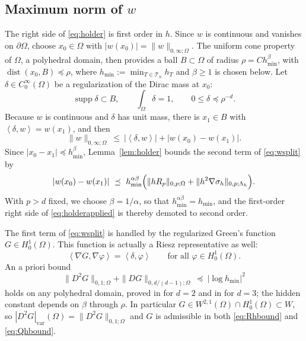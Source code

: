 \documentclass[12pt]{amsart}
\numberwithin{equation}{section}
\theoremstyle{plain}
\theoremstyle{definition}
\theoremstyle{remark}
\newcommand{\Om}{\Omega}
\newcommand{\dOm}{\partial\Omega}
\newcommand{\Th}{\mathcal{T}_h}
\newcommand{\Lamh}{\Lambda_h}
\begin{document}
\subsection{Maximum norm of \texorpdfstring{$w$}{w}}  The right side of \eqref{eq:holder} is first order in $h$.  Since $w$ is continuous and vanishes on $\dOm$, choose $x_0\in\Om$ with $|w(x_0)| = \|w\|_{0,\infty;\Om}$.  The uniform cone property \cite[\S 4.7]{Adams1975} of $\Om$, a polyhedral domain, then provides a ball $B \subset \Om$ of radius $\rho = C h_{\min}^\beta$, with $\operatorname{dist}(x_0,B) \preceq \rho$, where $h_{\min} := \min_{T\in\Th} h_T$ and $\beta \ge 1$ is chosen below.  Let $\delta \in C_0^\infty(\Om)$ be a regularization of the Dirac mass at $x_0$:
\begin{equation}
\label{eq:delta}
  \operatorname{supp}\delta \subset B, \qquad \int_\Om \delta = 1, \qquad 0 \le \delta \preceq \rho^{-d}.
\end{equation}
Because $w$ is continuous and $\delta$ has unit mass, there is $x_1 \in B$ with $\left<\delta,w\right> = w(x_1)$, and then
\begin{equation}
\label{eq:wsplit}
  \|w\|_{0,\infty;\Om} \ \le\ \bigl|\left<\delta,w\right>\bigr| + |w(x_0)-w(x_1)|.
\end{equation}
Since $|x_0 - x_1| \preceq h_{\min}^\beta$, Lemma~\ref{lem:holder} bounds the second term of \eqref{eq:wsplit} by
\begin{equation}
\label{eq:holderapplied}
  |w(x_0)-w(x_1)| \ \preceq\ h_{\min}^{\alpha\beta}\Bigl(\|hR_p\|_{0,p;\Om} + \|h^2\nabla\sigma_h\|_{0,p;\Lamh}\Bigr).
\end{equation}
With $p > d$ fixed, we choose $\beta = 1/\alpha$, so that $h_{\min}^{\alpha\beta} = h_{\min}$, and the first-order right side of \eqref{eq:holderapplied} is thereby demoted to second order.

The first term of \eqref{eq:wsplit} is handled by the regularized Green's function $G \in H_0^1(\Om)$.  This function is actually a Riesz representative as well:
\begin{equation}
\label{eq:green}
  \left<\nabla G,\nabla\varphi\right> = \left<\delta,\varphi\right> \qquad \text{for all } \varphi\in H_0^1(\Om).
\end{equation}
An a priori bound
\begin{equation}
\label{eq:greenbound}
  \|D^2 G\|_{0,1;\Om} + \|DG\|_{0,d/(d-1);\Om} \ \preceq\ |\log h_{\min}|^2
\end{equation}
holds on any polyhedral domain, proved in \cite{Nochetto1995} for $d=2$ and in \cite{Darietal2000} for $d=3$; the hidden constant depends on $\beta$ through $\rho$.  In particular $G \in W^{2,1}(\Om)\cap H_0^1(\Om) \subset W$, so $|D^2G|_{\mathrm{var}}(\Om) = \|D^2G\|_{0,1;\Om}$ and $G$ is admissible in both \eqref{eq:Rhbound} and \eqref{eq:Qhbound}.
\end{document}
